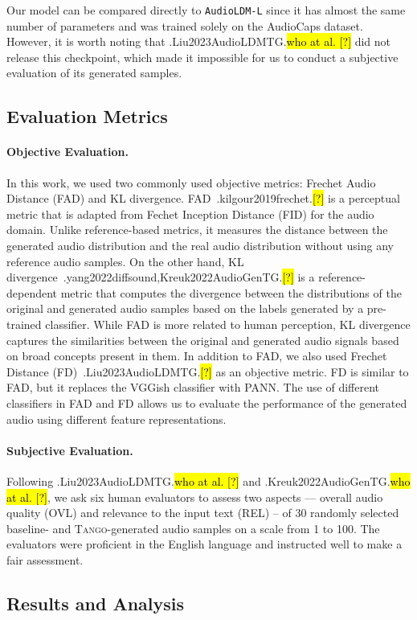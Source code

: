 \documentclass{article}
\newcommand{\model}{\textsc{Tango}}
\let\realcite\cite
\renewcommand{\cite}[1]{\ifx.#1.\hl{[?]}\else\realcite{#1}\fi}
\let\realcitet\citet
\renewcommand{\citet}[1]{\ifx.#1.\hl{who at al. [?]}\else\realcitet{#1}\fi}
\begin{document}
Our model can be compared directly to \texttt{AudioLDM-L} since it has almost the same number of parameters and was trained solely on the AudioCaps dataset. However, it is worth noting that \citet{Liu2023AudioLDMTG} did not release this checkpoint, which made it impossible for us to conduct a subjective evaluation of its generated samples.
\subsection{Evaluation Metrics}
\paragraph{Objective Evaluation.}
 In this work, we used two commonly used objective metrics: Frechet Audio Distance (FAD) and KL divergence. FAD~\cite{kilgour2019frechet} is a perceptual metric that is adapted from Fechet Inception Distance (FID) for the audio domain. Unlike reference-based metrics, it measures the distance between the generated audio distribution and the real audio distribution without using any reference audio samples. On the other hand, KL divergence~\cite{yang2022diffsound,Kreuk2022AudioGenTG} is a reference-dependent metric that computes the divergence between the distributions of the original and generated audio samples based on the labels generated by a pre-trained classifier. While FAD is more related to human perception, KL divergence captures the similarities between the original and generated audio signals based on broad concepts present in them. In addition to FAD, we also used Frechet Distance (FD)~\cite{Liu2023AudioLDMTG} as an objective metric. FD is similar to FAD, but it replaces the VGGish classifier with PANN. The use of different classifiers in FAD and FD allows us to evaluate the performance of the generated audio using different feature representations.
\paragraph{Subjective Evaluation.}

Following \citet{Liu2023AudioLDMTG} and \citet{Kreuk2022AudioGenTG}, we ask six human evaluators to assess two aspects –– overall audio quality (OVL) and relevance to the input text (REL) -- of 30 randomly selected baseline- and \model{}-generated audio samples on a scale from 1 to 100. The evaluators were proficient in the English language and instructed well to make a fair assessment.

\subsection{Results and Analysis}
\end{document}
